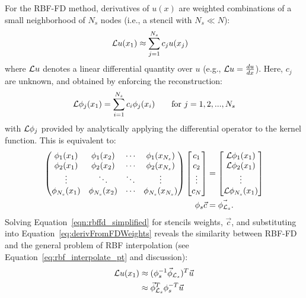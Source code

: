 \documentclass{report}
\begin{document}
{For the RBF-FD method, derivatives of $u(x)$ are weighted combinations of a small neighborhood of $N_s$ nodes (i.e., a stencil with $N_s \ll N$):
        \begin{align} 
        \mathcal{L}u(x_1) &\approx \sum_{j=1}^{N_s} c_j u(x_j) \nonumber 
        \label{eq:derivFromFDWeights}
        \end{align}
where $\mathcal{L}u$ denotes a linear differential quantity over $u$ (e.g., $\mathcal{L}u = \frac{d u}{d x}$). Here, ${c_j}$ are unknown, and obtained by enforcing the reconstruction:
	\begin{align}
	        \mathcal{L}\phi_j(x_1) = \sum_{i=1}^{N_s} c_i \phi_j(x_i) \ \ \ \ \ \ \textrm{for }j=1,2,...,N_s \nonumber 
	\end{align}
with $\mathcal{L}\phi_j$ provided by analytically applying the differential operator to the kernel function.
This is equivalent to: 
	\begin{align}        
          \begin{pmatrix}  
            \phi_1(x_1) & \phi_1(x_2) & \cdots & \phi_1(x_{N_s}) \\ 
            \phi_2(x_1) & \phi_2(x_2) & \cdots & \phi_2(x_{N_s}) \\ 
            \vdots & \ddots & \ddots & \vdots \\
            \phi_{N_s}(x_1) & \phi_{N_s}(x_2) & \cdots & \phi_{N_s}(x_{N_s})
                \end{pmatrix} 
                \begin{bmatrix} c_1 \\ c_2 \\ \vdots \\ c_N \end{bmatrix}
               &=                \begin{bmatrix} \diffop{\phi_1}(x_1) \\  \diffop{\phi_2}(x_1) \\ \vdots \\  \diffop{\phi_{N_s}}(x_1) 
               \end{bmatrix} \\
                         \phi_{s} \vec{c} &= \vec{\phi_{\diffop{}_s}}.%
                         \label{eqn:rbffd_simplified}
        \end{align} 
Solving Equation~\ref{eqn:rbffd_simplified} for stencils weights, $\vec{c}$, and substituting into Equation~\ref{eq:derivFromFDWeights} reveals the similarity between RBF-FD and the general problem of RBF interpolation (see Equation~\ref{eq:rbf_interpolate_pt} and discussion): 
        \begin{align*} 
        \mathcal{L}u(x_1) &\approx (\phi^{-1}_s \vec{\phi}_{\mathcal{L}_s})^T \vec{u} \\
        &\approx \vec{\phi}_{\mathcal{L}_s}^T \phi^{-T}_s \vec{u}
        \label{eq:rbffd_approx_derivs}
        \end{align*}
        
}
\end{document}
